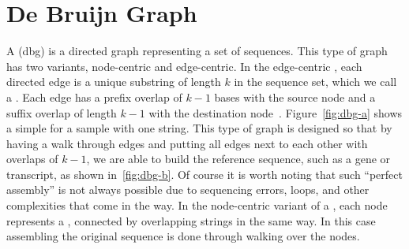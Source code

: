 \section{De Bruijn Graph}
\label{subsec:dbg}
A \dbg (dbg) is a directed graph representing a set of sequences.
This type of graph has two variants, node-centric and edge-centric.
In the edge-centric \dbg, each directed edge is a unique substring of length $k$ in the sequence set,
which we call a \kmer. Each edge has a prefix overlap of $k-1$ bases with the source node
and a suffix overlap of length $k-1$ with the destination node~\cite{paten2017genome}.
Figure~\ref{fig:dbg-a} shows a simple \dbg for a sample with one string.
This type of graph is designed so that by having a walk through edges and
putting all edges next to each other with overlaps of $k-1$,
we are able to build the reference sequence, such as a gene or transcript,
as shown in~\ref{fig:dbg-b}. Of course it is worth noting that such ``perfect assembly''
is not always possible due to sequencing errors, loops, and other complexities that come in the way.
In the node-centric variant of a \dbg, each node represents a \kmer,
connected by overlapping strings in the same way. In this case assembling the original sequence
is done through walking over the nodes.


